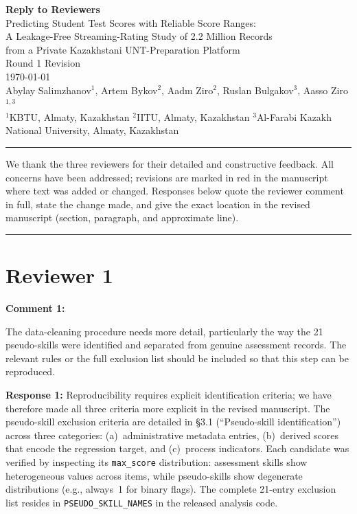 \documentclass[11pt]{article}
\newcommand{\rev}[1]{{\color{ccolor}#1}}
\begin{document}
\begin{center}
{\LARGE\bfseries Reply to Reviewers}\\[6pt]
{\large Predicting Student Test Scores with Reliable Score Ranges:\\
A Leakage-Free Streaming-Rating Study of 2.2 Million Records\\
from a Private Kazakhstani UNT-Preparation Platform}\\[4pt]
{\large Round 1 Revision}\\[6pt]
\today\\[8pt]
{\normalsize
Abylay Salimzhanov$^{1}$,\quad
Artem Bykov$^{2}$,\quad
Aadm Ziro$^{2}$,\quad
Ruslan Bulgakov$^{3}$,\quad
Aasso Ziro$^{1,3}$}\\[4pt]
{\small
$^{1}$KBTU, Almaty, Kazakhstan\quad
$^{2}$IITU, Almaty, Kazakhstan\quad
$^{3}$Al-Farabi Kazakh National University, Almaty, Kazakhstan}
\end{center}

\hrule
\vspace{10pt}

We thank the three reviewers for their detailed and constructive feedback.
All concerns have been addressed; revisions are marked in \rev{red} in the
manuscript where text was added or changed.
Responses below quote the reviewer comment in full, state the change made, and
give the exact location in the revised manuscript (section, paragraph, and
approximate line).

\bigskip
\hrule

\section*{Reviewer 1}

\bigskip

\textbf{Comment 1:}
\begin{rquote}
The data-cleaning procedure needs more detail, particularly the way the 21 pseudo-skills
were identified and separated from genuine assessment records. The relevant rules or the
full exclusion list should be included so that this step can be reproduced.
\end{rquote}

\textbf{Response 1:}
Reproducibility requires explicit identification criteria; we have therefore
made all three criteria more explicit in the revised manuscript.
The pseudo-skill exclusion criteria are detailed in \S3.1 (``Pseudo-skill identification'') across three categories:
(a)~administrative metadata entries, (b)~derived scores that encode the regression
target, and (c)~process indicators. Each candidate was verified by inspecting its
\texttt{max\_score} distribution: assessment skills show heterogeneous values
across items, while pseudo-skills show degenerate distributions (e.g., always~1 for
binary flags). The complete 21-entry exclusion list resides in
\texttt{PSEUDO\_SKILL\_NAMES} in the released analysis code.
\end{document}
